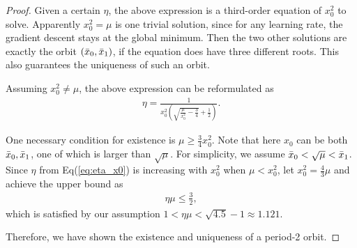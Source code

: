 \documentclass{article}
\theoremstyle{plain}
\theoremstyle{remark}
\begin{document}
\begin{proof}
Given a certain $\eta$, the above expression is a third-order equation of $x_0^2$ to solve. Apparently $x_0^2=\mu$ is one trivial solution, since for any learning rate, the gradient descent stays at the global minimum. Then the two other solutions are exactly the orbit $(\Bar{x}_0, \Bar{x}_1)$, if the equation does have three different roots. This also guarantees the uniqueness of such an orbit.

Assuming $x_0^2\neq\mu$, the above expression can be reformulated as
\begin{align}
    \eta=\frac{1}{x_0^2\left( \sqrt{\frac{\mu}{x_0^2}-\frac{3}{4}}+\frac{1}{2} \right)}.
    \label{eq:eta_x0}
\end{align}

One necessary condition for existence is $\mu\ge \frac{3}{4}x_0^2$. Note that here $x_0$ can be both $\Bar{x}_0, \Bar{x}_1$, one of which is larger than $\sqrt{\mu}$. For simplicity, we assume $\Bar{x}_0 <\sqrt{\mu}< \Bar{x}_1$. Since $\eta$ from Eq(\ref{eq:eta_x0}) is increasing with $x_0^2$ when $\mu<x_0^2$, let $x_0^2=\frac{4}{3}\mu$ and achieve the upper bound as
\begin{align}
    \eta\mu \le \frac{3}{2}, \label{eq:eta_exist_bound}
\end{align}
which is satisfied by our assumption $1<\eta\mu< \sqrt{4.5}-1\approx 1.121.$

Therefore, we have shown the existence and uniqueness of a period-2 orbit.





\end{proof}
\end{document}
